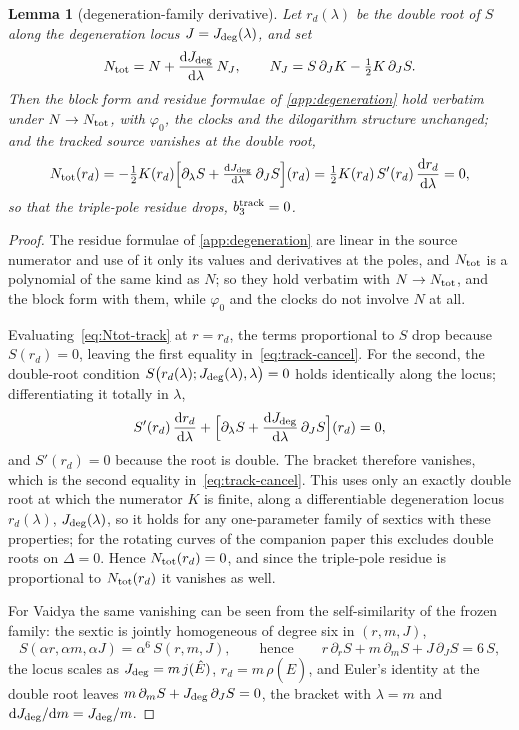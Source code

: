 \documentclass[12pt]{iopart}
\newcommand{\Ehat}{\hat E}
\newcommand{\Jc}{J_{\rm deg}}
\newcommand{\dd}{\mathrm{d}}
\theoremstyle{plain}
\newtheorem{lemma}[theorem]{Lemma}
\theoremstyle{definition}
\theoremstyle{plain}
\theoremstyle{remark}
\newcommand{\Ithm}[1]{\setcounter{theorem}{\numexpr#1-1\relax}}
\begin{document}
\Ithm{6}
\begin{lemma}[degeneration-family derivative]\label{lem:tracking}
Let $r_d(\lambda)$ be the double root of $S$ along the degeneration locus
$J=\Jc(\lambda)$, and set
\begin{equation}
N_{\rm tot}=N+\frac{\dd\Jc}{\dd\lambda}\,N_J,\qquad
N_J=S\,\partial_JK-\tfrac12K\,\partial_JS.
\label{eq:Ntot-track}
\end{equation}
Then the block form and residue formulae of \ref{app:degeneration} hold verbatim under
$N\to N_{\rm tot}$, with $\varphi_0$, the clocks and the dilogarithm structure unchanged;
and the tracked source vanishes at the double root,
\begin{equation}
N_{\rm tot}(r_d)=-\tfrac12K(r_d)\Big[\partial_\lambda S
+\tfrac{\dd\Jc}{\dd\lambda}\,\partial_JS\Big](r_d)
=\tfrac12K(r_d)\,S'(r_d)\,\frac{\dd r_d}{\dd\lambda}=0,
\label{eq:track-cancel}
\end{equation}
so that the triple-pole residue drops, $b_3^{\rm track}=0$.
\end{lemma}

\begin{proof}
The residue formulae of \ref{app:degeneration} are linear in the source numerator and use
of it only its values and derivatives at the poles, and $N_{\rm tot}$ is a polynomial of the
same kind as $N$; so they hold verbatim with $N\to N_{\rm tot}$, and the block form with them,
while $\varphi_0$ and the clocks do not involve $N$ at all.

Evaluating~\eqref{eq:Ntot-track} at $r=r_d$, the terms proportional to $S$ drop because
$S(r_d)=0$, leaving the first equality in~\eqref{eq:track-cancel}. For the second, the
double-root condition $S\big(r_d(\lambda);\Jc(\lambda),\lambda\big)=0$ holds identically
along the locus; differentiating it totally in $\lambda$,
\[
   S'(r_d)\,\frac{\dd r_d}{\dd\lambda}
   +\Big[\partial_\lambda S+\frac{\dd\Jc}{\dd\lambda}\,\partial_JS\Big](r_d)=0 ,
\]
and $S'(r_d)=0$ because the root is double. The bracket therefore vanishes, which is the
second equality in~\eqref{eq:track-cancel}. This uses only an exactly double root at which
the numerator $K$ is finite, along a differentiable degeneration locus $r_d(\lambda)$,
$J_{\rm deg}(\lambda)$, so it holds for any one-parameter family of sextics with these
properties; for the rotating curves of the companion paper this excludes double roots on
$\Delta=0$. Hence $N_{\rm tot}(r_d)=0$, and since the triple-pole residue is proportional
to $N_{\rm tot}(r_d)$ it vanishes as well.

For Vaidya the same vanishing can be seen from the self-similarity of the frozen family:
the sextic is jointly homogeneous of degree six in $(r,m,J)$,
\[
   S(\alpha r,\alpha m,\alpha J)=\alpha^6\,S(r,m,J),
   \qquad\text{hence}\qquad
   r\,\partial_rS+m\,\partial_mS+J\,\partial_JS=6\,S ,
\]
the locus scales as $\Jc=m\,j(\Ehat)$, $r_d=m\,\rho(\Ehat)$, and Euler's identity at the double
root leaves $m\,\partial_mS+\Jc\,\partial_JS=0$, the bracket with $\lambda=m$ and
$\dd\Jc/\dd m=\Jc/m$.
\end{proof}
\end{document}
